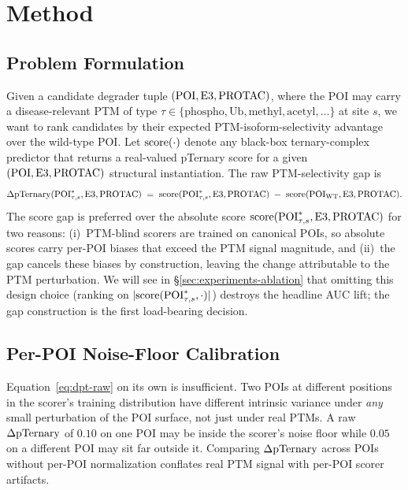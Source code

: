 \section{Method}
\label{sec:method}

\subsection{Problem Formulation}
\label{sec:method-problem}

Given a candidate degrader tuple $(\mathrm{POI},\mathrm{E3},\mathrm{PROTAC})$, where the POI may carry a disease-relevant PTM of type $\tau \in \{\text{phospho}, \text{Ub}, \text{methyl}, \text{acetyl}, \dots\}$ at site $s$, we want to rank candidates by their expected PTM-isoform-selectivity advantage over the wild-type POI. Let $\mathrm{score}(\cdot)$ denote any black-box ternary-complex predictor that returns a real-valued pTernary score for a given $(\mathrm{POI},\mathrm{E3},\mathrm{PROTAC})$ structural instantiation. The raw PTM-selectivity gap is
\begin{equation}
\label{eq:dpt-raw}
\Delta\mathrm{pTernary}(\mathrm{POI}^{*}_{\tau,s},\mathrm{E3},\mathrm{PROTAC}) \;=\; \mathrm{score}(\mathrm{POI}^{*}_{\tau,s},\mathrm{E3},\mathrm{PROTAC}) \;-\; \mathrm{score}(\mathrm{POI}_{\mathrm{WT}},\mathrm{E3},\mathrm{PROTAC}).
\end{equation}
The score gap is preferred over the absolute score $\mathrm{score}(\mathrm{POI}^{*}_{\tau,s},\mathrm{E3},\mathrm{PROTAC})$ for two reasons: (i)~PTM-blind scorers are trained on canonical POIs, so absolute scores carry per-POI biases that exceed the PTM signal magnitude, and (ii)~the gap cancels these biases by construction, leaving the change attributable to the PTM perturbation. We will see in \S\ref{sec:experiments-ablation} that omitting this design choice (ranking on $|\mathrm{score}(\mathrm{POI}^{*}_{\tau,s},\cdot)|$) destroys the headline AUC lift; the gap construction is the first load-bearing decision.

\subsection{Per-POI Noise-Floor Calibration}
\label{sec:method-calibration}

Equation~\ref{eq:dpt-raw} on its own is insufficient. Two POIs at different positions in the scorer's training distribution have different intrinsic variance under \emph{any} small perturbation of the POI surface, not just under real PTMs. A raw $\Delta\mathrm{pTernary}$ of $0.10$ on one POI may be inside the scorer's noise floor while $0.05$ on a different POI may sit far outside it. Comparing $\Delta\mathrm{pTernary}$ across POIs without per-POI normalization conflates real PTM signal with per-POI scorer artifacts.


